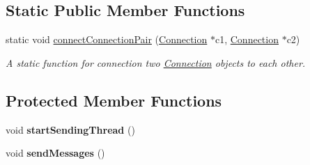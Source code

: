 \subsection*{Static Public Member Functions}
\begin{DoxyCompactItemize}
\item 
\hypertarget{classPseudoTcp_1_1Connection_a5cd5c700ba9aaca941b6f6ef198a620b}{
static void \hyperlink{classPseudoTcp_1_1Connection_a5cd5c700ba9aaca941b6f6ef198a620b}{connectConnectionPair} (\hyperlink{classPseudoTcp_1_1Connection}{Connection} $\ast$c1, \hyperlink{classPseudoTcp_1_1Connection}{Connection} $\ast$c2)}
\label{classPseudoTcp_1_1Connection_a5cd5c700ba9aaca941b6f6ef198a620b}

\begin{DoxyCompactList}\small\item\em A static function for connection two \hyperlink{classPseudoTcp_1_1Connection}{Connection} objects to each other. \item\end{DoxyCompactList}\end{DoxyCompactItemize}
\subsection*{Protected Member Functions}
\begin{DoxyCompactItemize}
\item 
\hypertarget{classPseudoTcp_1_1Connection_a61cdf90cae14c6108dc9b8382705cb79}{
void {\bfseries startSendingThread} ()}
\label{classPseudoTcp_1_1Connection_a61cdf90cae14c6108dc9b8382705cb79}

\item 
\hypertarget{classPseudoTcp_1_1Connection_af2b81f6a75b4c0dbd0306721ccf1d599}{
void {\bfseries sendMessages} ()}
\label{classPseudoTcp_1_1Connection_af2b81f6a75b4c0dbd0306721ccf1d599}

\end{DoxyCompactItemize}
